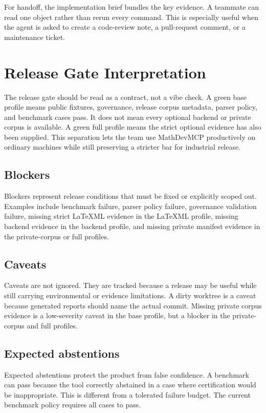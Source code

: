 \documentclass[12pt,a4paper,openany]{book}
\begin{document}
For handoff, the implementation brief bundles the key evidence. A teammate can
read one object rather than rerun every command. This is especially useful when
the agent is asked to create a code-review note, a pull-request comment, or a
maintenance ticket.

\chapter{Release Gate Interpretation}

The release gate should be read as a contract, not a vibe check. A green base
profile means public fixtures, governance, release corpus metadata, parser
policy, and benchmark cases pass. It does not mean every optional backend or
private corpus is available. A green full profile means the strict optional
evidence has also been supplied. This separation lets the team use MathDevMCP
productively on ordinary machines while still preserving a stricter bar for
industrial release.

\section{Blockers}

Blockers represent release conditions that must be fixed or explicitly scoped
out. Examples include benchmark failure, parser policy failure, governance
validation failure, missing strict LaTeXML evidence in the LaTeXML profile,
missing backend evidence in the backend profile, and missing private manifest
evidence in the private-corpus or full profiles.

\section{Caveats}

Caveats are not ignored. They are tracked because a release may be useful while
still carrying environmental or evidence limitations. A dirty worktree is a
caveat because generated reports should name the actual commit. Missing private
corpus evidence is a low-severity caveat in the base profile, but a blocker in
the private-corpus and full profiles.

\section{Expected abstentions}

Expected abstentions protect the product from false confidence. A benchmark can
pass because the tool correctly abstained in a case where certification would
be inappropriate. This is different from a tolerated failure budget. The
current benchmark policy requires all cases to pass.
\end{document}
